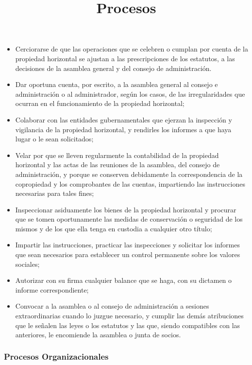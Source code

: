 \begin{itemize}
	
\item Cerciorarse de que las operaciones que se celebren o cumplan por cuenta de la propiedad horizontal se ajustan a las prescripciones de los estatutos, a las decisiones de la asamblea general y del consejo de administración.
\item Dar oportuna cuenta, por escrito, a la asamblea general al consejo e administración o al administrador, según los casos, de las irregularidades que ocurran en el funcionamiento de la propiedad horizontal;
\item Colaborar con las entidades gubernamentales que ejerzan la inspección y vigilancia de la propiedad horizontal, y rendirles los informes a que haya lugar o le sean solicitados;
\item Velar por que se lleven regularmente la contabilidad de la propiedad horizontal y las actas de las reuniones de la asamblea, del consejo de administración, y porque se conserven debidamente la correspondencia de la copropiedad y los comprobantes de las cuentas, impartiendo las instrucciones necesarias para tales fines;
\item Inspeccionar asiduamente los bienes de la propiedad horizontal y procurar que se tomen oportunamente las medidas de conservación o seguridad de los mismos y de los que ella tenga en custodia a cualquier otro título;
\item Impartir las instrucciones, practicar las inspecciones y solicitar los informes que sean necesarios para establecer un control permanente sobre los valores sociales;
\item Autorizar con su firma cualquier balance que se haga, con su dictamen o informe correspondiente;
\item Convocar a la asamblea o al consejo de administración a sesiones extraordinarias cuando lo juzgue necesario, y cumplir las demás atribuciones que le señalen las leyes o los estatutos y las que, siendo compatibles con las anteriores, le encomiende la asamblea o junta de socios.
\end{itemize}	

\subsubsection{Procesos Organizacionales}

\title{Procesos}

